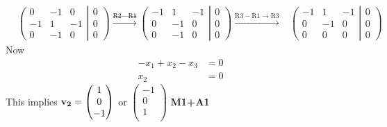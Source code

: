 \documentclass[12pt]{exam}
\begin{document}
\begin{questions}
\begin{solution}
\begin{enumerate}
	\begin{align*}
	& \left(
	\begin{matrix}
	0 & -1 & 0  \\
	-1 & 1 & -1\\
	0 & -1 &  0 
	\end{matrix}
	\right.\left|\left.
	\begin{matrix}
	0\\ 0 \\ 0
	\end{matrix}
	\right)\right. 
	\xrightarrow{\text{R2}\to\text{R1}} 
	\left(
	\begin{matrix}
	-1 & 1 & -1  \\
	0 & -1 & 0\\
	0 & -1 &  0 
	\end{matrix}
	\right.\left|\left.
	\begin{matrix}
	0\\ 0 \\ 0
	\end{matrix}
	\right)\right.
	\xrightarrow{\text{R3}-\text{R1}\to\text{R3}} 
	& \left(
	\begin{matrix}
	-1 & 1 & -1  \\
	0 & -1 & 0\\
	0 & 0 &  0 
	\end{matrix}
	\right.\left|\left.
	\begin{matrix}
	0\\ 0 \\ 0
	\end{matrix}
	\right)\right.
	\end{align*}
	Now \begin{align*}
	-x_1+x_2 -x_3&= 0\\
	x_2 &= 0
	\end{align*}
	This implies $ \bf{v_2} = \begin{pmatrix}
	1 \\
	0 \\
	-1\\
	\end{pmatrix}$ or  $\begin{pmatrix}
	-1 \\
	0\\
	1\\
	\end{pmatrix}$ \hfill\textbf{M1+A1}
	

\end{enumerate}
\end{solution}
\end{questions}
\end{document}
